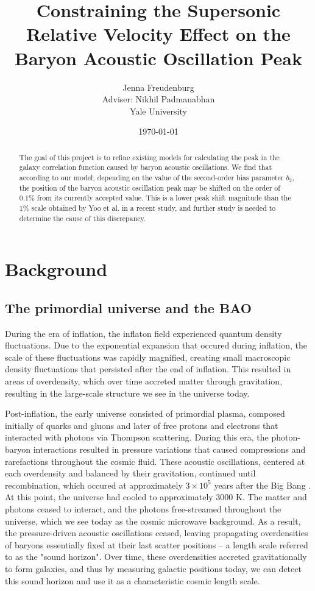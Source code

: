\documentclass[12pt]{article}
\title{Constraining the Supersonic Relative Velocity Effect on the Baryon Acoustic Oscillation Peak}
\author{Jenna Freudenburg \\
                Adviser: Nikhil Padmanabhan\\
                Yale University
}
\date{\today}
\begin{document}
\maketitle

\begin{abstract} 
The goal of this project is to refine existing models for calculating the peak in the galaxy correlation function caused by baryon acoustic oscillations. We find that according to our model, depending on the value of the second-order bias parameter $b_{2}$, the position of the baryon acoustic oscillation peak may be shifted on the order of 0.1\% from its currently accepted value. This is a lower peak shift magnitude than the 1\% scale obtained by Yoo et al. in a recent study, and further study is needed to determine the cause of this discrepancy.
\end{abstract}

\tableofcontents

\section{Background}
\subsection{The primordial universe and the BAO}

During the era of inflation, the inflaton field experienced quantum density fluctuations. Due to the exponential expansion that occured during inflation, the scale of these fluctuations was rapidly magnified, creating small macroscopic density fluctuations that persisted after the end of inflation. This resulted in areas of overdensity, which over time accreted matter through gravitation, resulting in the large-scale structure we see in the universe today.

Post-inflation, the early universe consisted of primordial plasma, composed initially of quarks and gluons and later of free protons and electrons that interacted with photons via Thompson scattering. During this era, the photon-baryon interactions resulted in pressure variations that caused compressions and rarefactions throughout the cosmic fluid. These acoustic oscillations, centered at each overdensity and balanced by their gravitation, continued until recombination, which occured at approximately $3\times10^{5}$ years after the Big Bang \cite{Eisenstein}. At this point, the universe had cooled to approximately 3000 K. The matter and photons ceased to interact, and the photons free-streamed throughout the universe, which we see today as the cosmic microwave background. As a result, the pressure-driven acoustic oscillations ceased, leaving propagating overdensities of baryons essentially fixed at their last scatter positions -- a length scale referred to as the "sound horizon". Over time, these overdensities accreted gravitationally to form galaxies, and thus by measuring galactic positions today, we can detect this sound horizon and use it as a characteristic cosmic length scale. 
\end{document}
